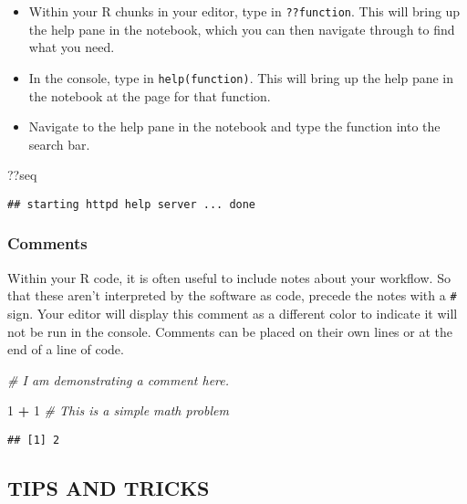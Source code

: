 \documentclass[]{article}
\newenvironment{Shaded}{\begin{snugshade}}{\end{snugshade}}
\newcommand{\DecValTok}[1]{\textcolor[rgb]{0.00,0.00,0.81}{#1}}
\newcommand{\StringTok}[1]{\textcolor[rgb]{0.31,0.60,0.02}{#1}}
\newcommand{\CommentTok}[1]{\textcolor[rgb]{0.56,0.35,0.01}{\textit{#1}}}
\newcommand{\OperatorTok}[1]{\textcolor[rgb]{0.81,0.36,0.00}{\textbf{#1}}}
\newcommand{\NormalTok}[1]{#1}
\begin{document}
\begin{itemize}
\item
  Within your R chunks in your editor, type in \texttt{??function}. This
  will bring up the help pane in the notebook, which you can then
  navigate through to find what you need.
\item
  In the console, type in \texttt{help(function)}. This will bring up
  the help pane in the notebook at the page for that function.
\item
  Navigate to the help pane in the notebook and type the function into
  the search bar.
\end{itemize}

\begin{Shaded}
\begin{Highlighting}[]
\NormalTok{??seq}
\end{Highlighting}
\end{Shaded}

\begin{verbatim}
## starting httpd help server ... done
\end{verbatim}

\subsubsection{Comments}\label{comments}

Within your R code, it is often useful to include notes about your
workflow. So that these aren't interpreted by the software as code,
precede the notes with a \texttt{\#} sign. Your editor will display this
comment as a different color to indicate it will not be run in the
console. Comments can be placed on their own lines or at the end of a
line of code.

\begin{Shaded}
\begin{Highlighting}[]
\CommentTok{# I am demonstrating a comment here. }

\DecValTok{1} \OperatorTok{+}\StringTok{ }\DecValTok{1} \CommentTok{# This is a simple math problem}
\end{Highlighting}
\end{Shaded}

\begin{verbatim}
## [1] 2
\end{verbatim}

\subsection{TIPS AND TRICKS}\label{tips-and-tricks}
\end{document}
